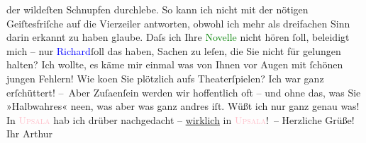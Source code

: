                         {\pb}der wildeſten Schnupfen durchlebe. So kann ich
                    nicht mit der nötigen Geiſtesfriſche auf die Vierzeiler antworten, obwohl ich
                    mehr als dreifachen Sinn darin erkannt zu haben glaube.\pend
           \pstart
           Daſs ich Ihre \textcolor{green}{Novelle}{} nicht
                    hören ſoll, beleidigt mich – nur \textcolor{blue}{Richard}{}\ledrightnote{\textcolor{blue}{Richard Beer-Hofmann}}{ }ſoll das \label{K_L00582_2v}\label{K_L00582_2h}
                    haben, Sachen zu leſen, die Sie nicht für gelungen halten?\pend
           \pstart
           Ich wollte, es käme mir einmal {\pb}was von Ihnen vor
                    Augen mit ſchönen jungen Fehlern!\pend
           \pstart
           Wie ko{\geminationm}en Sie plötzlich aufs Theaterſpielen? Ich war
                    ganz erſchüttert!\pend
           \pstart
           – Aber Zuſa{\geminationm}enſein werden wir hoffentlich oft – und
                    ohne das, was Sie »Halbwahres« ne{\geminationn}en, was aber was
                    ganz andres iſt.\pend
           \pstart
           Wüßt ich nur ganz genau was! In \textcolor{pink}{\textsc{Upsala}}{}\ledrightnote{\textcolor{pink}{Uppsala}} hab ich drüber nachgedacht – \uline{wirklich} in
                        \textcolor{pink}{\textsc{Upsala}}{}\ledrightnote{\textcolor{pink}{Uppsala}}! –\pend
           \pstart Herzliche Grüße! Ihr \spacefill\mbox{Arthur}\pend{}\endnumbering{}  
      